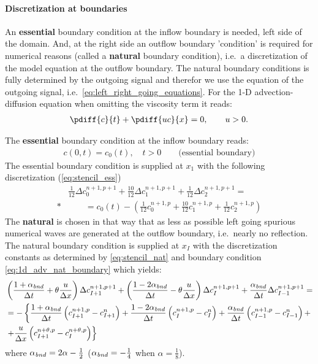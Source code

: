 \paragraph*{Discretization at boundaries}
An \textbf{essential} boundary condition at the inflow boundary is needed, left side of the domain.
And, at the right side an outflow boundary 'condition' is required for numerical reasons (called  a \textbf{natural} boundary condition), i.e.\ a discretization of the model equation at the outflow boundary.
The natural boundary conditions is fully determined by the outgoing signal and therefor we use the equation of the outgoing signal, i.e.\ \autoref{eq:left_right_going_equations}.
For the 1-D advection-diffusion equation when omitting the viscosity term it reads:
\begin{align}
    \pdiff{c}{t} + \pdiff{uc}{x}  = 0, \qquad u>0. \label{eq:1d_adv_nat_boundary}
\end{align}

The \textbf{essential} boundary condition at the inflow boundary reads:
\begin{align}
    c(0,t) = c_0(t), \quad t > 0 \qquad \text{(essential boundary)}
\end{align}
The essential boundary condition is supplied at $x_1$ with the following discretization (\autoref{eq:stencil_ess})
\begin{align}
    &\frac{1}{12} \Delta c^{n+1,p+1}_0 + \frac{10}{12} \Delta c^{n+1,p+1}_1 + \frac{1}{12}\Delta c^{n+1,p+1}_2 =
    \nonumber \\*
    &\qquad =c_0(t) - \left( \frac{1}{12} c^{n+1,p}_0 + \frac{10}{12} c^{n+1,p}_1 + \frac{1}{12} c^{n+1,p}_2 \right)
\end{align}
The \textbf{natural} is chosen in that way that as less as possible left going spurious numerical waves are generated at the outflow boundary, i.e.\ nearly no reflection.
The natural boundary condition is supplied at $x_I$ with the discretization constants as determined by \autoref{eq:stencil_nat} and boundary condition \autoref{eq:1d_adv_nat_boundary} which yields:
\begin{align}
    &\left( \frac{1+\alpha_{\it bnd}}{\Delta t} + \theta \frac{u}{\Delta x} \right) \Delta c^{n+1,p+1}_{I+1} +
     \left( \frac{1-2\alpha_{\it bnd}}{\Delta t} - \theta \frac{u}{\Delta x} \right) \Delta c^{n+1,p+1}_I +
      \frac{\alpha_{\it bnd}}{\Delta t}  \Delta c^{n+1,p+1}_{I-1}  =
    \\
    & = - \left\{
          \frac{1+\alpha_{\it bnd}}{\Delta t} \left( c^{n+1,p}_{I+1} - c^n_{I+1} \right)
        + \frac{1-2\alpha_{\it bnd}}{\Delta t} \left( c^{n+1,p}_{I} - c^n_{I} \right)
        + \frac{\alpha_{\it bnd}}{\Delta t} \left( c^{n+1,p}_{I-1}- c^n_{I-1} \right) +
        \right. \\
    & \left. + \frac{u}{\Delta x} \left(c^{n+\theta,p}_{I+1} - c^{n+\theta,p}_{I} \right)
        \right\}
\end{align}
where $\alpha_{\it bnd} = 2\alpha -\frac{1}{2}$ ($\alpha_{\it bnd} = -\frac{1}{4}$ when $\alpha = \frac{1}{8}$).

